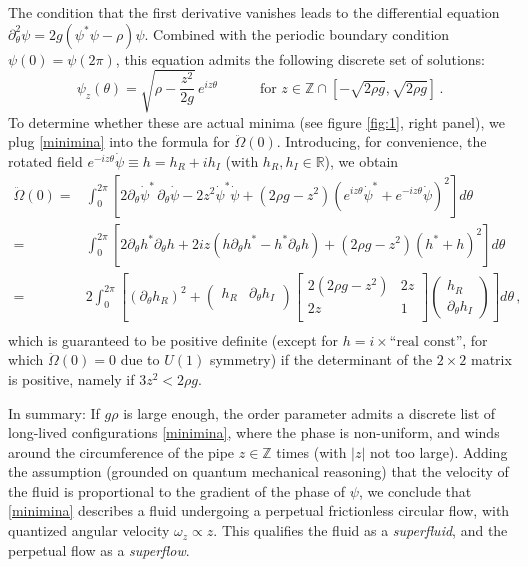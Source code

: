 \documentclass[a4paper, amsfonts, amssymb, amsmath, reprint, showkeys, nofootinbib, twoside,notitlepage,onecolumn]{revtex4-2}
\newcommand{\spc}{\quad \quad \quad}
\theoremstyle{definition}
\theoremstyle{theorem}
\theoremstyle{corollary}
\begin{document}
\noindent The condition that the first derivative vanishes leads to the differential equation $\partial^2_\theta \psi = 2g(\psi^* \psi - \rho)\psi$. Combined with the periodic boundary condition $\psi(0) = \psi(2\pi)$, this equation admits the following discrete set of solutions:
\vspace{-0.1cm}
\begin{equation}\label{minimina}
\psi_z(\theta)=\sqrt{\rho-\dfrac{z^2}{2g}} \, e^{iz\theta}  \spc \text{for }z\in \mathbb{Z}\cap [-\sqrt{2\rho g},\sqrt{2\rho g}] \, .
\end{equation}
To determine whether these are actual minima (see figure \ref{fig:1}, right panel), we plug \eqref{minimina} into the formula for $\ddot{\Omega}(0)$. Introducing, for convenience, the rotated field
$e^{-iz\theta}\dot{\psi}\equiv h=h_R +ih_I$ (with $h_R,h_I \in \mathbb{R}$), we obtain
\vspace{-0.1cm}
\begin{equation}
\begin{split}
\ddot{\Omega}(0)={}& \int_0^{2\pi} \left[2\partial_\theta \dot{\psi}^* \, \partial_\theta \dot{\psi} -2z^2 \dot{\psi}^* \dot{\psi}+(2\rho g{-}z^2)(e^{iz\theta}\dot{\psi}^*+e^{-iz\theta} \dot{\psi})^2\right] d\theta  \\
={}& \int_0^{2\pi} \left[2\partial_\theta h^* \partial_\theta h+2iz(h\partial_\theta h^*-h^* \partial_\theta h) +(2\rho g{-}z^2)(h^* {+}h)^2\right] d\theta \\
={}& 2\int_0^{2\pi} \left[(\partial_\theta h_R)^2 +
\begin{pmatrix}
h_R & \partial_\theta h_I \\
\end{pmatrix}
\begin{bmatrix}
2(2\rho g -z^2) & 2z \\
2z & 1 \\
\end{bmatrix}
\begin{pmatrix}
h_R \\
\partial_\theta h_I
\end{pmatrix}
\right] d\theta  \, ,\\
\end{split}
\end{equation}
which is guaranteed to be positive definite (except for $h=i \times \text{``real const''}$, for which $\ddot{\Omega}(0)=0$ due to $U(1)$ symmetry) if the determinant of the $2\times 2$ matrix is positive, namely if $3z^2<2\rho g$.

In summary: If $g \rho$ is large enough, the order parameter admits a discrete list of long-lived configurations \eqref{minimina}, where the phase is non-uniform, and winds around the circumference of the pipe $z \in \mathbb{Z}$ times (with $|z|$ not too large). Adding the assumption (grounded on quantum mechanical reasoning) that the velocity of the fluid is proportional to the gradient of the phase of $\psi$, we conclude that \eqref{minimina} describes a fluid undergoing a perpetual frictionless circular flow, with quantized angular velocity $\omega_z \propto z$. This qualifies the fluid as a \textit{superfluid}, and the perpetual flow as a \textit{superflow}.
\end{document}
